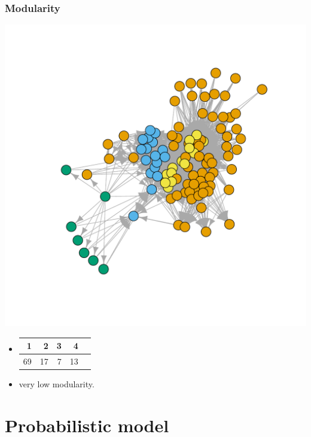 \documentclass[compress,10pt]{beamer}
\begin{document}
\begin{frame}
 \frametitle{Modularity}
\begin{center}
  \includegraphics[scale=.3]{plots/chilean_modularity.pdf}
 \end{center}
 
 
 
 \begin{itemize}
  \item
  \begin{tabular}{rrrrr}
  \hline
 1 & 2 & 3 & 4 \\ 
  \hline
  69 &  17 &   7 &  13 \\ 
   \hline
\end{tabular}
\item very low modularity.
 \end{itemize}

 
\end{frame}

 
\section{Probabilistic  model}
\end{document}
